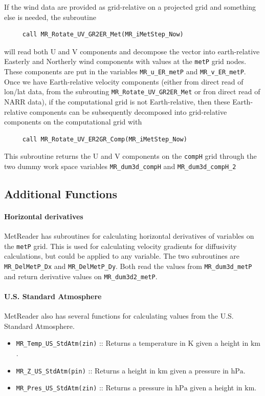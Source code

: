 \documentclass[11pt]{article}   %
\begin{document}
If the wind data are provided as grid-relative on a projected grid and something else
is needed, the subroutine
\begin{verbatim}
     call MR_Rotate_UV_GR2ER_Met(MR_iMetStep_Now)
\end{verbatim}
will read both U and V components and decompose the vector into earth-relative Easterly
and Northerly wind components with values at the \texttt{metP} grid nodes.  These
components are put in the variables \texttt{MR\_u\_ER\_metP} and \texttt{MR\_v\_ER\_metP}.
Once we have Earth-relative velocity components (either from direct read of lon/lat data,
from the subrouting \texttt{MR\_Rotate\_UV\_GR2ER\_Met} or fron direct read of NARR data),
if the computational grid is not Earth-relative, then these Earth-relative components can be
subsequently decomposed into grid-relative components on the computational grid with
\begin{verbatim}
     call MR_Rotate_UV_ER2GR_Comp(MR_iMetStep_Now)
\end{verbatim}
This subroutine returns the U and V components on the \texttt{compH} grid through the two
dummy work space variables \texttt{MR\_dum3d\_compH} and \texttt{MR\_dum3d\_compH\_2}

\subsection{Additional Functions}
\paragraph{Horizontal derivatives}
MetReader has subroutines for calculating horizontal derivatives of variables on the
\texttt{metP} grid.  This is used for calculating velocity gradients for diffusivity
calculations, but could be applied to any variable.  The two subroutines are
\texttt{MR\_DelMetP\_Dx} and \texttt{MR\_DelMetP\_Dy}.  Both read the values from
\texttt{MR\_dum3d\_metP} and return derivative values on \texttt{MR\_dum3d2\_metP}.

\paragraph{U.S. Standard Atmosphere}
MetReader also has several functions for calculating values from the U.S. Standard
Atmosphere.
\begin{itemize}
\item  \texttt{MR\_Temp\_US\_StdAtm(zin)} :: Returns a temperature in $\mathrm{K}$
given a height in $\mathrm{km}$.
\item  \texttt{MR\_Z\_US\_StdAtm(pin)} :: Returns a height in $\mathrm{km}$ given a
pressure in $\mathrm{hPa}$.
\item  \texttt{MR\_Pres\_US\_StdAtm(zin)} :: Returns a pressure in $\mathrm{hPa}$ given
a height in $\mathrm{km}$.
\end{itemize}
\end{document}
